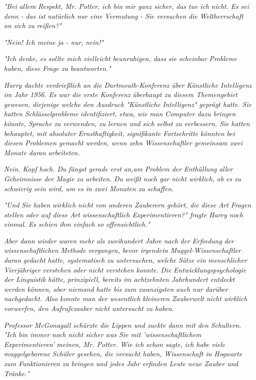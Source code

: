 {\emph{"Bei allem Respekt, Mr. Potter, ich bin mir ganz sicher, das tue ich nicht. Es sei denn - das ist natürlich nur eine Vermutung - Sie versuchen die Weltherrschaft an sich zu reißen?"}

\emph{"Nein! Ich meine ja - nur,} \emph{\emph{nein!}"}

\emph{"Ich denke, es sollte mich vielleicht beunruhigen, dass sie scheinbar Probleme haben, diese Frage zu beantworten."}

\emph{Harry dachte verdrießlich an die Dartmouth-Konferenz über Künstliche Intelligenz im Jahr 1956. Es war die erste Konferenz überhaupt zu diesem Themengebiet gewesen, diejenige welche den Ausdruck "Künstliche Intelligenz" geprägt hatte. Sie hatten Schlüsselprobleme identifiziert, etwa, wie man Computer dazu bringen könnte, Sprache zu verwenden, zu lernen und sich selbst zu verbessern. Sie hatten behauptet, mit absoluter Ernsthaftigkeit, signifikante Fortschritte könnten bei diesen Problemen gemacht werden, wenn zehn Wissenschaftler gemeinsam zwei Monate daran arbeiteten.}

\emph{\emph{Nein. Kopf hoch. Du fängst gerade erst}} \emph{an\emph{,}\emph{am Problem der Enthüllung aller Geheimnisse der Magie zu arbeiten. Du}} \emph{weißt} \emph{\emph{noch gar nicht wirklich, ob es zu schwierig sein wird, um es in zwei Monaten zu schaffen.}}

\emph{"Und Sie haben} \emph{\emph{wirklich}} \emph{nicht von anderen Zauberern gehört, die diese Art Fragen stellen oder auf diese Art wissenschaftlich Experimentieren?" fragte Harry noch einmal. Es schien ihm einfach so} \emph{\emph{offensichtlich.}"}

\emph{Aber dann wieder waren mehr als zweihundert Jahre} \emph{\emph{nach}} \emph{der Erfindung der wissenschaftlichen Methode vergangen, bevor irgendein Muggel-Wissenschaftler daran gedacht hatte, systematisch zu untersuchen, welche Sätze ein} \emph{\emph{menschlicher Vierjähriger}} \emph{verstehen oder nicht verstehen konnte. Die Entwicklungspsychologie der Linguistik hätte, prinzipiell, bereits im achtzehnten Jahrhundert entdeckt werden können, aber niemand hatte bis zum zwanzigsten auch nur darüber nachgedacht. Also konnte man der wesentlich kleineren Zauberwelt nicht wirklich vorwerfen, den Aufrufezauber nicht untersucht zu haben.}

\emph{Professor McGonagall schürzte die Lippen und zuckte dann mit den Schultern. "Ich bin immer noch nicht sicher was Sie mit 'wissenschaftlichem Experimentieren' meinen, Mr. Potter. Wie ich schon sagte, ich habe viele muggelgeborene Schüler gesehen, die versucht haben, Wissenschaft in Hogwarts zum Funktionieren zu bringen und jedes Jahr erfinden Leute neue Zauber und Tränke."}

}
